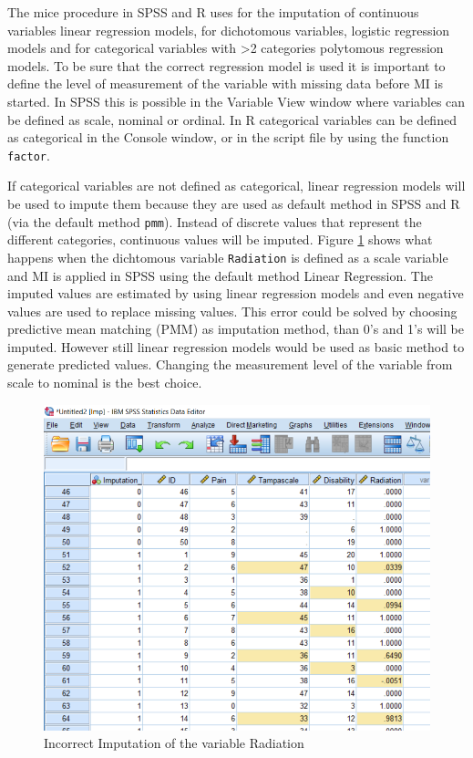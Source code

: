 \documentclass[
]{book}
\begin{document}
The mice procedure in SPSS and R uses for the imputation of continuous variables linear regression models, for dichotomous variables, logistic regression models and for categorical variables with \textgreater2 categories polytomous regression models. To be sure that the correct regression model is used it is important to define the level of measurement of the variable with missing data before MI is started. In SPSS this is possible in the Variable View window where variables can be defined as scale, nominal or ordinal. In R categorical variables can be defined as categorical in the Console window, or in the script file by using the function \texttt{factor}.

If categorical variables are not defined as categorical, linear regression models will be used to impute them because they are used as default method in SPSS and R (via the default method \texttt{pmm}). Instead of discrete values that represent the different categories, continuous values will be imputed. Figure \ref{fig:fig4-25} shows what happens when the dichtomous variable \texttt{Radiation} is defined as a scale variable and MI is applied in SPSS using the default method Linear Regression. The imputed values are estimated by using linear regression models and even negative values are used to replace missing values. This error could be solved by choosing predictive mean matching (PMM) as imputation method, than 0's and 1's will be imputed. However still linear regression models would be used as basic method to generate predicted values. Changing the measurement level of the variable from scale to nominal is the best choice.

\begin{figure}

{\centering \includegraphics[width=0.9\linewidth]{images/fig4.25} 

}

\caption{Incorrect Imputation of the variable Radiation}\label{fig:fig4-25}
\end{figure}
\end{document}
